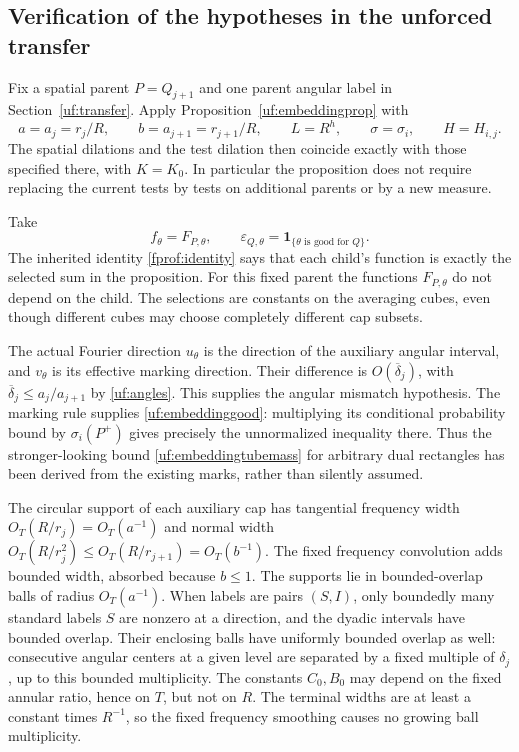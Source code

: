 \subsection*{Verification of the hypotheses in the unforced transfer}

Fix a spatial parent \(P=Q_{j+1}\) and one parent angular label in
Section~\ref{uf:transfer}. Apply Proposition~\ref{uf:embeddingprop}
with
$$
 a=a_j=r_j/R,\qquad b=a_{j+1}=r_{j+1}/R,\qquad
 L=R^h,\qquad \sigma=\sigma_i,\qquad H=H_{i,j}.
$$
The spatial dilations and the test dilation then coincide exactly with
those specified there, with \(K=K_0\). In particular the proposition
does not require replacing the current tests by tests on additional
parents or by a new measure.

Take
$$
 f_\theta=F_{P,\theta},\qquad
 \varepsilon_{Q,\theta}=
    \mathbf 1_{\{\theta\text{ is good for }Q\}}.
$$
The inherited identity \eqref{fprof:identity} says that each child's
function is exactly the selected sum in the proposition. For this
fixed parent the functions \(F_{P,\theta}\) do not depend on the
child. The selections are constants on the averaging cubes, even
though different cubes may choose completely different cap subsets.

The actual Fourier direction \(u_\theta\) is the direction of the
auxiliary angular interval, and \(v_\theta\) is its effective marking
direction. Their difference is \(O(\overline\delta_j)\), with
\(\overline\delta_j\leq a_j/a_{j+1}\) by
\eqref{uf:angles}. This supplies the angular mismatch hypothesis.
The marking rule supplies \eqref{uf:embeddinggood}: multiplying its
conditional probability bound by \(\sigma_i(P^+)\) gives precisely
the unnormalized inequality there. Thus the stronger-looking bound
\eqref{uf:embeddingtubemass} for arbitrary dual rectangles has been
derived from the existing marks, rather than silently assumed.

The circular support of each auxiliary cap has tangential frequency
width \(O_T(R/r_j)=O_T(a^{-1})\) and normal width
\(O_T(R/r_j^2)\leq O_T(R/r_{j+1})=O_T(b^{-1})\).
The fixed frequency convolution adds bounded width, absorbed because
\(b\leq1\). The supports lie in bounded-overlap balls of radius
\(O_T(a^{-1})\). When labels are pairs \((S,I)\), only boundedly
many standard labels \(S\) are nonzero at a direction, and the
dyadic intervals have bounded overlap. Their enclosing balls have
uniformly bounded overlap as well: consecutive angular centers at a
given level are separated by a fixed multiple of \(\delta_j\),
up to this bounded multiplicity. The constants \(C_0,B_0\) may
depend on the fixed annular ratio, hence on \(T\), but not on \(R\).
The terminal widths are at least a constant times \(R^{-1}\), so
the fixed frequency smoothing causes no growing ball multiplicity.

